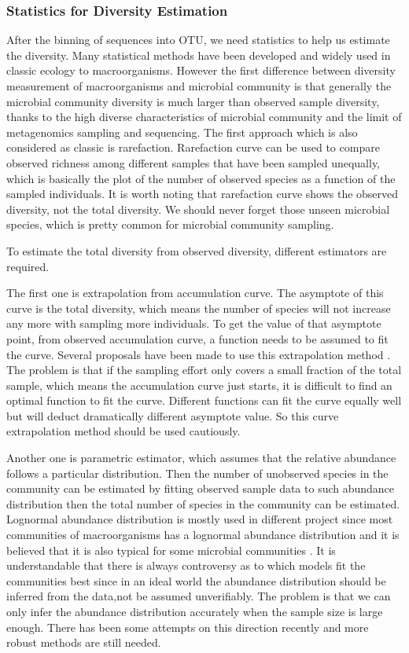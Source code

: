 \subsubsection{Statistics for Diversity Estimation}
After the binning of sequences into OTU, we need statistics to help us estimate the diversity. Many statistical methods have been
developed and widely used in classic ecology to macroorganisms. However the first difference between 
diversity measurement of macroorganisms and microbial community is that generally the microbial community diversity is much larger than 
observed sample diversity, thanks to the high diverse characteristics of microbial community and the limit of 
metagenomics sampling and sequencing. The first approach which is also considered as classic is rarefaction.
Rarefaction curve can be used to compare observed richness among different samples that have been sampled unequally, which
is basically the plot of the number of observed species as a function of the sampled individuals.
It is worth noting that rarefaction curve shows the observed diversity, not the total diversity. We should never forget
those unseen microbial species, which is pretty common for microbial community sampling.  

To estimate the total diversity from observed diversity, different estimators are required.

The first one is extrapolation from accumulation curve. The asymptote of this curve is the total diversity, which means the
number of species will not increase any more with sampling more individuals. To get the value of that asymptote point,
from observed accumulation curve, a function needs to be assumed to fit the curve. Several proposals have been made to use this
extrapolation method \cite{colwell2004interpolating, gotelli2001quantifying}. The problem is that if the sampling effort
only covers a small fraction of the total sample, which means the accumulation curve just starts, it is difficult to find 
an optimal function to fit the curve. Different functions can fit the curve equally well but will deduct dramatically different asymptote
value. So this curve extrapolation method should be used cautiously.

Another one is parametric estimator, which assumes that the relative abundance follows a particular distribution. Then the 
number of unobserved species in the community can be estimated by fitting observed sample data to such abundance
distribution then the total number of species in the community can be estimated.
Lognormal abundance distribution is mostly used in different project since most communities of macroorganisms has a 
lognormal abundance distribution and it is believed that it is also typical for some 
microbial communities \cite{Curtis:2002aa, Schloss:2006aa, Quince:2008aa}. It is understandable that there 
is always controversy as to which models fit the communities best since in an ideal world the abundance 
distribution should be inferred from the data,not be assumed unverifiably. The problem is that we can only 
infer the abundance distribution accurately when the sample size is large enough. There has been some attempts on this direction
recently \cite{Gans:2005aa} and more robust methods are still needed.

